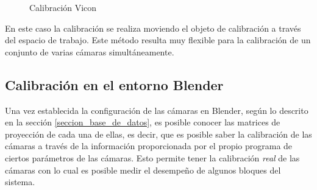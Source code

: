 \begin{figure}[H]
        \centering
        
        \hspace{1.8cm}
  \caption{Calibración Vicon}
      \label{vicon}
\end{figure}

En este caso la calibración se realiza moviendo el objeto de calibración a través del espacio de trabajo. Este método resulta muy flexible para la calibración de un conjunto de varias cámaras simultáneamente.


\subsection{Calibración en el entorno Blender}

Una vez establecida la configuración de las cámaras en  Blender, según lo descrito en la sección \ref{seccion_base_de_datos}, es posible conocer las matrices de proyección de cada una de ellas, es decir, que es posible saber la calibración de las cámaras a través de la información proporcionada por el propio programa de ciertos parámetros de las cámaras. Esto permite tener la calibración \textit{real} de las cámaras con lo cual es posible medir el desempeño de algunos bloques del sistema.\\

